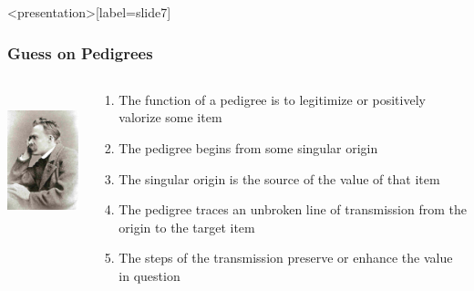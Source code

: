 \begin{frame}<presentation>[label=slide7]
    \frametitle{Guess on Pedigrees}
        \begin{columns}
            \begin{column}{3cm}
                \includegraphics[height=4cm]{../../graphics/nietzsche.jpg}
            \end{column}
            \begin{column}{7cm}
                \begin{enumerate}
                    \item The function of a pedigree is to legitimize or positively valorize some item
                    \item The pedigree begins from some singular origin
                    \item The singular origin is the source of the value of that item
                    \item The pedigree traces an unbroken line of transmission from the origin to the target item
                    \item The steps of the transmission preserve or enhance the value in question
                \end{enumerate}
            \end{column}
        \end{columns}
\end{frame}




